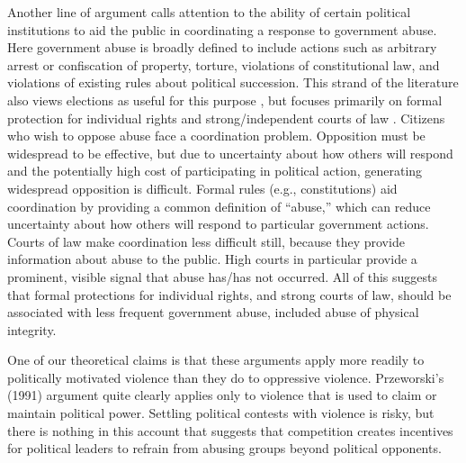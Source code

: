 \documentclass[12pt]{article}
\begin{document}
Another line of argument calls attention to the ability of certain political institutions to aid the public in coordinating a response to government abuse. Here government abuse is broadly defined to include actions such as arbitrary arrest or confiscation of property, torture, violations of constitutional law, and violations of existing rules about political succession. This strand of the literature also views elections as useful for this purpose \citep[E.g.,][]{Fearon2011}, but focuses primarily on formal protection for individual rights and strong/independent courts of law \citep{NorthWeingast1989,Weingast1997,Vanberg2005,ElkinsGinsburgMelton2009,PowellStaton2009,Melton2013}. Citizens who wish to oppose abuse face a coordination problem. Opposition must be widespread to be effective, but due to uncertainty about how others will respond and the potentially high cost of participating in political action, generating widespread opposition is difficult. Formal rules (e.g., constitutions) aid coordination by providing a common definition of ``abuse,'' which can reduce uncertainty about how others will respond to particular government actions. Courts of law make coordination less difficult still, because they provide information about abuse to the public. High courts in particular provide a prominent, visible signal that abuse has/has not occurred. All of this suggests that formal protections for individual rights, and strong courts of law, should be associated with less frequent government abuse, included abuse of physical integrity. 

One of our theoretical claims is that these arguments apply more readily to politically motivated violence than they do to oppressive violence. Przeworski's (1991) argument quite clearly applies only to violence that is used to claim or maintain political power. Settling political contests with violence is risky, but there is nothing in this account that suggests that competition creates incentives for political leaders to refrain from abusing groups beyond political opponents.  
\end{document}
